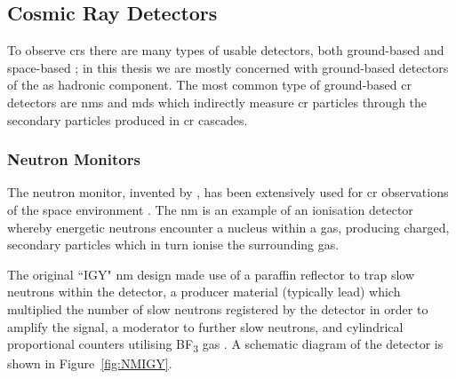 \subsection{Cosmic Ray Detectors}

To observe \glspl{cr} there are many types of usable detectors, both ground-based and space-based \citep{schrijver_heliophysics_2010}; in this thesis we are mostly concerned with ground-based detectors of the \gls{as} hadronic component. The most common type of ground-based \gls{cr} detectors are \glspl{nm} and \glspl{md} which indirectly measure \gls{cr} particles through the secondary particles produced in \gls{cr} cascades.

\subsubsection*{Neutron Monitors}
The neutron monitor, invented by \cite{simpson_latitude_1948}, has been extensively used for \gls{cr} observations of the space environment \citep{clem_neutron_2000}. The \gls{nm} is an example of an ionisation detector whereby energetic neutrons encounter a nucleus within a gas, producing charged, secondary particles which in turn ionise the surrounding gas.

The original ``IGY" \gls{nm} design made use of a paraffin reflector to trap slow neutrons within the detector, a producer material (typically lead) which multiplied the number of slow neutrons registered by the detector in order to amplify the signal, a moderator to further slow neutrons, and cylindrical proportional counters utilising BF\textsubscript{3} gas \citep{simpson_latitude_1948, simpson_cosmic_1953}. A schematic diagram of the detector is shown in Figure~\ref{fig:NMIGY}. %

